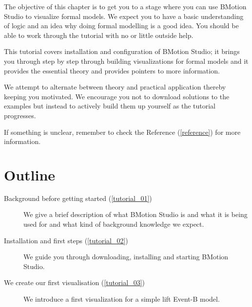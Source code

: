 
The objective of this chapter is to get you to a stage where you can use BMotion Studio to visualize formal models.  
We expect you to have a basic understanding of logic and an idea why doing formal modelling is a good idea.  
You should be able to work through the tutorial with no or little outside help.

This tutorial covers installation and configuration of BMotion Studio; it brings you through step by step through building visualizations for formal models and it provides the essential theory and provides pointers to more information.

We attempt to alternate between theory and practical application thereby keeping you motivated.  
We encourage you not to download solutions to the examples but instead to actively build them up yourself as the tutorial progresses.

If something is unclear, remember to check the Reference (\ref{reference}) for more information.

\section{Outline}

\begin{description}
	\item[Background before getting started (\ref{tutorial_01})] We give a brief description of what BMotion Studio is and what it is being used for and what kind of background knowledge we expect.
	\item[Installation and first steps (\ref{tutorial_02})] We guide you through downloading, installing and starting BMotion Studio. 
	\item[We create our first visualisation (\ref{tutorial_03})] We introduce a first visualization for a simple lift Event-B model. 
	
\end{description}

